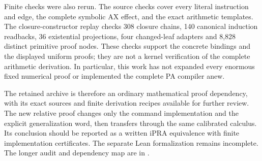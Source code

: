 Finite checks were also rerun.  The source checks cover every literal
instruction and edge, the complete symbolic AX effect, and the exact
arithmetic templates.  The closure-constructor replay checks 308 closure
chains, 140 canonical induction readbacks, 36 existential projections,
four changed-leaf adapters and 8,828 distinct primitive proof nodes.
These checks support the concrete bindings and the displayed uniform
proofs; they are not a kernel verification of the complete arithmetic
derivation.  In particular, this work has not expanded every enormous
fixed numerical proof or implemented the complete PA compiler anew.

The retained archive is therefore an ordinary mathematical proof
dependency, with its exact sources and finite derivation recipes
available for further review.  The new relative proof changes only
the command implementation and the explicit generalization word, then
transfers through the same calibrated calculus.  Its conclusion should
be reported as a written iPRA equivalence with finite implementation
certificates.  The separate Lean formalization remains incomplete.
The longer audit and dependency map are in .
